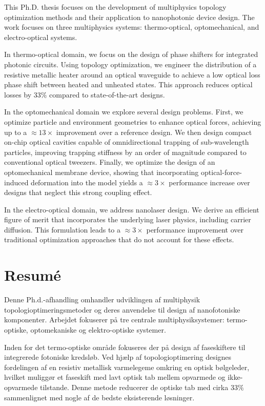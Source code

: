 This Ph.D. thesis focuses on the development of multiphysics topology optimization methods and their application to nanophotonic device design. The work focuses on three multiphysics systems: thermo-optical, optomechanical, and electro-optical systems.

In thermo-optical domain, we focus on the design of phase shifters for integrated photonic circuits. Using topology optimization, we engineer the distribution of a resistive metallic heater around an optical waveguide to achieve a low optical loss phase shift between heated and unheated states. This approach reduces optical losses by $33\%$ compared to state-of-the-art designs.

In the optomechanical domain we explore several design problems. First, we optimize particle and environment geometries to enhance optical forces, achieving up to a $\approx 13 \times$ improvement over a reference design. We then design compact on-chip optical cavities capable of omnidirectional trapping of sub-wavelength particles, improving trapping stiffness by an order of magnitude compared to conventional optical tweezers. Finally, we optimize the design of an optomechanical membrane device, showing that incorporating optical-force-induced deformation into the model yields a $\approx 3 \times$ performance increase over designs that neglect this strong coupling effect.

In the electro-optical domain, we address nanolaser design. We derive an efficient figure of merit that incorporates the underlying laser physics, including carrier diffusion. This formulation leads to a $\approx 3\times$ performance improvement over traditional optimization approaches that do not account for these effects.

\chapter*{Resumé}

Denne Ph.d.-afhandling omhandler udviklingen af multiphysik topologioptimeringsmetoder og deres anvendelse til design af nanofotoniske komponenter. Arbejdet fokuserer på tre centrale multiphysiksystemer: termo-optiske, optomekaniske og elektro-optiske systemer.

Inden for det termo-optiske område fokuseres der på design af faseskiftere til integrerede fotoniske kredsløb. Ved hjælp af topologioptimering designes fordelingen af en resistiv metallisk varmelegeme omkring en optisk bølgeleder, hvilket muliggør et faseskift med lavt optisk tab mellem opvarmede og ikke-opvarmede tilstande. Denne metode reducerer de optiske tab med cirka $33\%$ sammenlignet med nogle af de bedste eksisterende løsninger.

